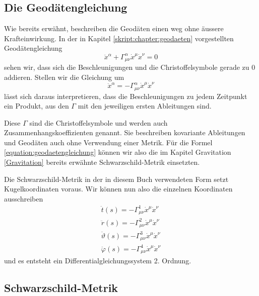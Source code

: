 \begin{refsection}
	\subsection{Die Geodätengleichung}\label{skript:chapter:zeitreisen:geodaetengl}
	Wie bereits erwähnt, beschreiben die Geodäten einen weg ohne äussere Krafteinwirkung. In der in Kapitel \ref{skript:chapter:geodaeten} vorgestellten Geodätengleichung
	\begin{equation}
	\ddot{x}^{\alpha} + \Gamma^{\alpha}_{\mu\nu}\dot{x}^{\mu}\dot{x}^{\nu} = 0
	\end{equation}
    sehen wir, dass sich die Beschleunigungen und die Christoffelsymbole gerade zu $0$ addieren.
	Stellen wir die Gleichung um	
	\begin{equation}\label{equation:geodaetengleichung}
	\ddot{x}^{\alpha} = -\Gamma^{\alpha}_{\mu\nu}\dot{x}^{\mu}\dot{x}^{\nu}
	\end{equation}
	lässt sich daraus interpretieren, dass die Beschleunigungen zu jedem Zeitpunkt ein Produkt, aus den $\Gamma$ mit den jeweiligen ersten Ableitungen sind.
    
	Diese $\Gamma$ sind die Christoffelsymbole und werden auch Zusammenhangskoeffizienten genannt. Sie beschreiben kovariante Ableitungen und Geodäten auch ohne Verwendung einer Metrik. Für die Formel \eqref{equation:geodaetengleichung} können wir also die im Kapitel Gravitation \ref{Gravitation} bereits erwähnte Schwarzschild-Metrik einsetzten.	
	 
	Die Schwarzschild-Metrik in der in diesem Buch verwendeten Form setzt Kugelkoordinaten voraus. Wir können nun also die einzelnen Koordinaten ausschreiben 	
	\begin{equation}\label{skript:chapter:zeitreisen:geodaeten4dim}
	\begin{aligned}
	\ddot{t}(s) = -\Gamma^{1}_{\mu\nu}\dot{x}^{\mu}\dot{x}^{\nu}\\
	\ddot{r}(s) = -\Gamma^{2}_{\mu\nu}\dot{x}^{\mu}\dot{x}^{\nu}\\
	\ddot{\vartheta}(s) = -\Gamma^{3}_{\mu\nu}\dot{x}^{\mu}\dot{x}^{\nu}\\
	\ddot{\varphi}(s) = -\Gamma^{4}_{\mu\nu}\dot{x}^{\mu}\dot{x}^{\nu}	
	\end{aligned}
	\end{equation}
    und es entsteht ein Differentialgleichungssystem 2. Ordnung.

	\subsection{Schwarzschild-Metrik}\label{Schwarzschild-Metrik}
	

\end{refsection}

